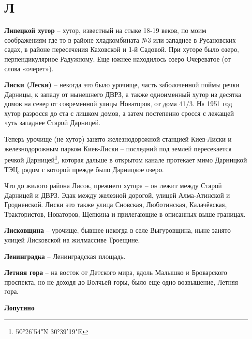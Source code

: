 \chapter*{Л}

\textbf{Липецкой хутор} – хутор, известный на стыке 18-19 веков, по моим соображениям где-то в районе хладкомбината №3 или западнее в Русановских садах, в районе пересечения Каховской и 1-й Садовой. При хуторе было озеро, перпендикулярное Радужному. Еще южнее находилось озеро Очереватое (от слова «очерет»).\\

\medskip


\textbf{Лиски (Лески)} – некогда это было урочище, часть заболоченной поймы речки Дарницы, к западу от нынешнего ДВРЗ, а также одноименный хутор из десятка домов на север от современной улицы Новаторов, от дома 41/3. На 1951 год хутор разросся до ста с лишком домов, а затем постепенно сросся с лежащей чуть западнее Старой Дарницей.

Теперь урочище (не хутор) занято железнодорожной станцией Киев-Лиски и железнодорожным парком Киев-Лиски – последний под землей пересекается речкой Дарницей\footnote{50°26'54"N 30°39'19"E}, которая дальше в открытом канале протекает мимо Дарницкой ТЭЦ, рядом с которой прежде было Дарницкое озеро.

Что до жилого района Лисок, прежнего хутора – он лежит между Старой Дарницей и ДВРЗ. Эдак между железной дорогой, улицей Алма-Атинской и Гродненской. Лиски это также улица Сновская, Люботинская, Калачёвская, Трактористов, Новаторов, Щепкина и прилегающие в описанных выше границах.\\

\medskip


\textbf{Лисковщина} – урочище, бывшее некогда в селе Выгуровщина, ныне занято улицей Лисковской на жилмассиве Троещине.\\

\medskip


\textbf{Ленинградка} – Ленинградская площадь.\\

\medskip


\textbf{Летняя гора} – на восток от Детского мира, вдоль Малышко и Броварского проспекта, но не доходя до Волчьей горы, было еще одно возвышение, Летняя гора.\\

\medskip

\textbf{Лопутино}

